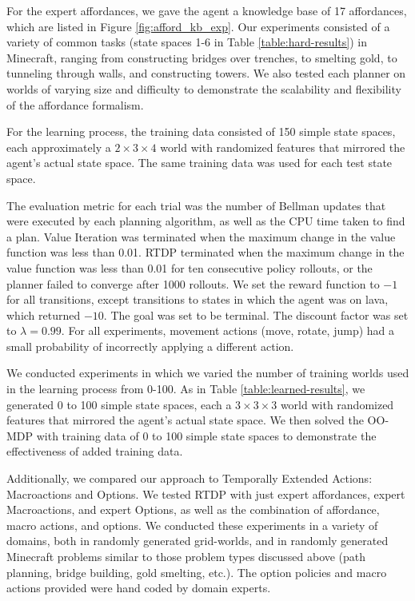 \documentclass[conference]{IEEEtran}
\begin{document}
For the expert affordances, we gave the agent a knowledge base of 17 affordances,
which are listed in Figure \ref{fig:afford_kb_exp}.  Our experiments
consisted of a variety of common tasks (state spaces 1-6 in Table \ref{table:hard-results}) in Minecraft, ranging from
constructing bridges over trenches, to smelting gold, to tunneling
through walls, and constructing towers.  We also tested each planner on worlds of varying size
and difficulty to demonstrate the scalability and flexibility of the
affordance formalism.

For the learning process, the training data consisted of 150 simple state
spaces, each approximately a $2\times3\times4$ world with randomized features that mirrored the agent's actual state space. The same training data was used
for each test state space.

The evaluation metric for each trial was the
number of Bellman updates that were executed by each planning
algorithm, as well as the CPU time taken to find a plan. Value Iteration was terminated when the maximum change in
the value function was less than 0.01. RTDP terminated when the
maximum change in the value function was less than 0.01 for ten
consecutive policy rollouts, or the planner failed to converge after 1000 rollouts.
We set the reward function to $-1$ for all transitions, except
transitions to states in which the agent was on lava, which returned 
$-10$. The goal was set to be terminal. The discount
factor was set to $\lambda = 0.99$. For all experiments, movement actions
(move, rotate, jump) had a small probability of incorrectly applying a different action.

We conducted experiments in which we varied the number of training worlds
used in the learning process from 0-100. As in Table \ref{table:learned-results}, we generated 0 to 100 simple state
spaces, each a $3\times3\times3$ world with randomized features that mirrored the agent's actual state space. We then solved
the OO-MDP with training data of 0 to 100 simple state spaces to demonstrate the effectiveness of added training data.

Additionally, we compared our approach to Temporally Extended Actions: Macroactions and Options. We tested RTDP with just expert affordances,
expert Macroactions, and expert Options, as well as the combination of affordance, macro actions, and options. We conducted these experiments in a variety of domains, both in randomly generated grid-worlds, and in randomly generated Minecraft problems similar to those problem types discussed above (path planning, bridge building, gold smelting, etc.). The option policies and macro actions provided were hand coded by domain experts.
\end{document}
